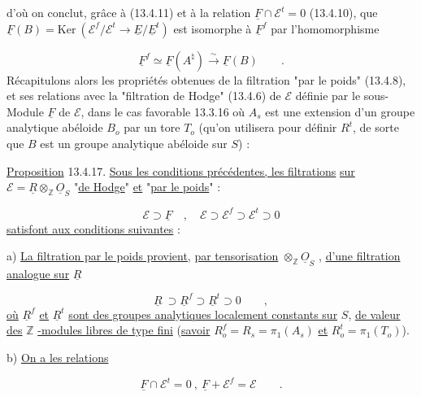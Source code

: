 
d'où on conclut, grâce à (13.4.11) et à la relation $\underline{F} \cap \mathcal{E}^t = 0$ (13.4.10), que $\underline{F}(B) = \mathrm{Ker}\ (\mathcal{E}^f/\mathcal{E}^t \longrightarrow \underline{E}/\underline{E}^t)$ est isomorphe à $\underline{F}^f$ par l'homomorphisme

\begin{equation}\tag{13.4.16}
\underline{F}^f \simeq \underline{F}(A^\natural) \overset{\sim}{\longrightarrow} \underline{F}(B) \qquad .
\end{equation}
Récapitulons alors les propriétés obtenues de la filtration "par le poids" (13.4.8), et ses relations avec la "filtration de Hodge" (13.4.6) de $\mathcal{E}$ définie par le sous-Module $\underline{F}$ de $\mathcal{E}$, dans le cas favorable 13.3.16 où $A_s$ est une extension d'un groupe analytique abéloide $B_o$ par un tore $T_o$ (qu'on utilisera pour définir $R^t$, de sorte que $B$ est un groupe analytique abéloide sur $S$) :

\underline{Proposition} 13.4.17. \underline{Sous les conditions précédentes, les filtrations} \underline{sur} $\mathcal{E} = \underline{R} \otimes_{\mathbb{Z}} \underline{O}_S$ "\underline{de Hodge}" \underline{et} "\underline{par le poids}" :

\begin{equation}\tag{13.4.17.1}
\mathcal{E} \supset \underline{F} \quad , \quad \mathcal{E} \supset \mathcal{E}^f \supset \mathcal{E}^t \supset 0
\end{equation}
\underline{satisfont aux conditions suivantes} :

a) \underline{La filtration par le poids provient,} \underline{par tensorisation} $\otimes_{\mathbb{Z}} \underline{O}_S$ , \underline{d'une filtration analogue sur} $\underline{R}$

\begin{equation*}
\underline{R} \ \supset \underline{R}^f \supset \underline{R}^t \supset 0 \qquad ,
\end{equation*}
\underline{où} $\underline{R}^f$ \underline{et} $\underline{R}^t$ \underline{sont des groupes analytiques localement constants sur} $S$, \underline{de valeur des} $\mathbb{Z}$ \underline{-modules libres de type fini} (\underline{savoir} $R_o^f = R_s = \pi_1(A_s)$ \underline{et} $R_o^t = \pi_1(T_o)$).

b) \underline{On a les relations}

\begin{equation}\tag{*}
\underline{F} \cap \mathcal{E}^t = 0 \ , \ \underline{F} + \mathcal{E}^f = \mathcal{E} \qquad .
\end{equation}


